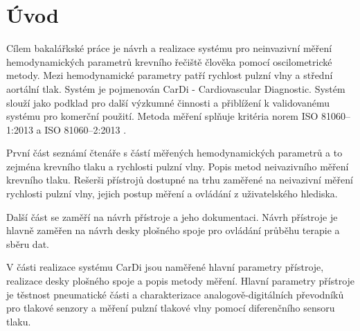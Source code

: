 \documentclass{ctuthesis}
\begin{document}
\maketitle



\chapter{Úvod}
Cílem bakalářkské práce je návrh a realizace systému pro neinvazivní měření hemodynamických parametrů krevního řečiště člověka pomocí oscilometrické metody. Mezi hemodynamické parametry patří rychlost pulzní vlny a střední aortální tlak.
Systém je pojmenován CarDi - Cardiovascular Diagnostic. Systém slouží jako podklad pro další výzkumné činnosti a přiblížení k validovanému systému pro komerční použití. Metoda měření splňuje kritéria norem ISO 81060–1:2013 a ISO 81060–2:2013 \cite{cite:Validation}.

\par
První část seznámí čtenáře s částí měřených hemodynamických parametrů a to zejména krevního tlaku a rychlosti pulzní vlny. Popis metod neivazivního měření krevního tlaku. Rešerši přístrojů dostupné na trhu zaměřené na neivazivní měření rychlosti pulzní vlny, jejich postup měření a ovládání z uživatelského hlediska.
\par
Další část se zaměří na návrh přístroje a jeho dokumentaci. Návrh přístroje je hlavně zaměřen na návrh desky plošného spoje pro ovládání průběhu terapie a sběru dat.
\par
V části realizace systému CarDi jsou naměřené hlavní parametry přístroje, realizace desky plošného spoje a popis metody měření. Hlavní parametry přístroje je těstnost pneumatické části a charakterizace analogově-digitálních převodníků pro tlakové senzory a měření pulzní tlakové vlny pomocí diferenčního sensoru tlaku.








\end{document}
